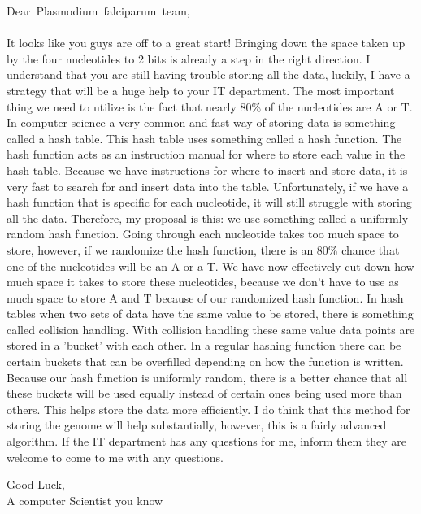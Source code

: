 \documentclass[12pt]{article}
\begin{document}
\newpage
\mbox{Dear Plasmodium falciparum team,}
\\ \\ It looks like you guys are off to a great start! Bringing down the space taken up by the four nucleotides to 2 bits is already a step in the right direction. I understand that you are still having trouble storing all the data, luckily, I have a strategy that will be a huge help to your IT department. The most important thing we need to utilize is the fact that nearly 80\% of the nucleotides are A or T. In computer science a very common and fast way of storing data is something called a hash table. This hash table uses something called a hash function. The hash function acts as an instruction manual for where to store each value in the hash table. Because we have instructions for where to insert and store data, it is very fast to search for and insert data into the table. Unfortunately, if we have a hash function that is specific for each nucleotide, it will still struggle with storing all the data. Therefore, my proposal is this: we use something called a uniformly random hash function. Going through each nucleotide takes too much space to store, however, if we randomize the hash function, there is an 80\% chance that one of the nucleotides will be an A or a T. We have now effectively cut down how much space it takes to store these nucleotides, because we don't have to use as much space to store A and T because of our randomized hash function. In hash tables when two sets of data have the same value to be stored, there is something called collision handling. With collision handling these same value data points are stored in a 'bucket' with each other. In a regular hashing function there can be certain buckets that can be overfilled depending on how the function is written. Because our hash function is uniformly random, there is a better chance that all these buckets will be used equally instead of certain ones being used more than others. This helps store the data more efficiently. I do think that this method for storing the genome will help substantially, however, this is a fairly advanced algorithm. If the IT department has any questions for me, inform them they are welcome to come to me with any questions.

Good Luck,
\\A computer Scientist you know
\newpage

\pagebreak
\end{document}
